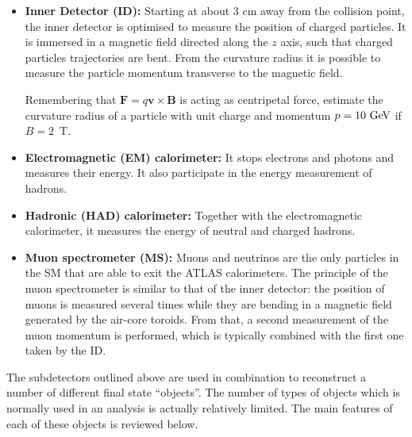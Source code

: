 \begin{itemize}

\item \textbf{Inner Detector (ID):} Starting at about 3 cm away from the collision point, the inner detector is optimised to measure the position of charged particles. It is immersed in a magnetic field directed along the $z$ axis, such that charged particles trajectories are bent. From the curvature radius it is possible to measure the particle momentum transverse to the magnetic field. 

\begin{exercise}
Remembering that $\mathbf{F} = q \mathbf{v} \times \mathbf{B}$ is acting as centripetal force, estimate the curvature radius of a particle with unit charge and momentum $p = 10\ \text{Ge\kern -0.1em V}$ if $B = 2$~T. 
\end{exercise}

\item \textbf{Electromagnetic (EM) calorimeter:} It stops electrons and photons and measures their energy. It also participate in the energy measurement of hadrons. 
\item \textbf{Hadronic (HAD) calorimeter:} Together with the electromagnetic calorimeter, it measures the energy of neutral and charged hadrons. 
\item \textbf{Muon spectrometer (MS):} Muons and neutrinos are the only particles in the SM that are able to exit the ATLAS calorimeters. The principle of the muon spectrometer is similar to that of the inner detector: the position of muons is measured several times while they are bending in a magnetic field generated by the air-core toroids. From that, a second measurement of the muon momentum is performed, which is typically  combined with the first one taken by the ID. 
\end{itemize}

The subdetectors outlined above are used in combination to reconstruct a number of different final state ``objects''. The number of types of objects which is normally used in an analysis is actually relatively limited. The main features of each of these objects is reviewed below. 

